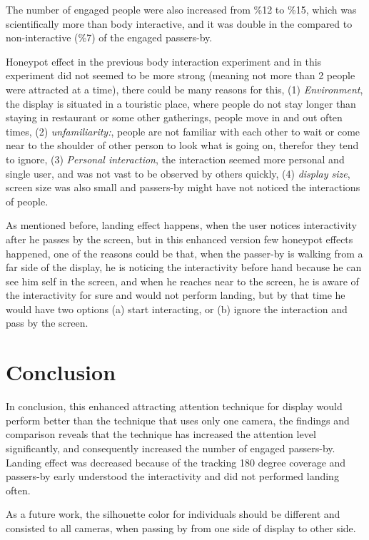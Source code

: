 The number of engaged people were also increased from \%12 to \%15, which was scientifically more than body interactive, and it was double in the compared to non-interactive (\%7) of the engaged passers-by. 

Honeypot effect in the previous body interaction experiment and in this experiment did not seemed to be more strong (meaning not more than 2 people were attracted at a time), there could be many reasons for this, (1) \emph{Environment}, the display is situated in a touristic place, where people do not stay longer than staying in restaurant or some other gatherings, people move in and out often times, (2) \emph{unfamiliarity:}, people are not familiar with each other to wait or come near to the shoulder of other person to look what is going on, therefor they tend to ignore, (3) \emph{Personal interaction}, the interaction seemed more personal and single user,  and was not vast to be observed by others quickly, (4) \emph{display size}, screen size was also small and passers-by might have not noticed the interactions of people.



As mentioned before, landing effect happens, when the user notices interactivity after he passes by the screen, but in this enhanced version few honeypot effects happened, one of the reasons could be that, when the passer-by is walking from a far side of the display, he is noticing the interactivity before hand because he can see him self in the screen, and when he reaches near to the screen, he is aware of the interactivity for sure and would not perform landing, but by that time he would have two options (a) start interacting, or (b) ignore the interaction and pass by the screen.



\section{Conclusion}


In conclusion, this enhanced attracting attention technique for display would perform better than the technique that uses only one camera, the findings and comparison reveals that the technique has increased the attention level significantly, and consequently increased the number of engaged passers-by. Landing effect was decreased because of the tracking 180 degree coverage and passers-by early understood the interactivity and did not performed landing often. 

As a future work, the silhouette color for individuals should be different and consisted to all cameras, when passing by from one side of display to other side. 


